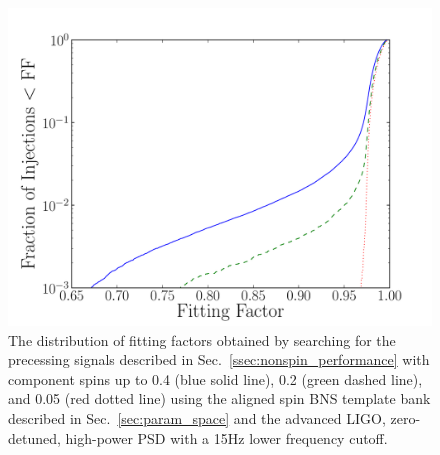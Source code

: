 \begin{figure}
\begin{center}
\includegraphics[width=1.0\textwidth]{papers/bns_spin/figure10.pdf}
\end{center}
\caption{\label{fig:anstar-prec} The distribution of fitting factors obtained by searching
for the precessing signals described in Sec.~\ref{ssec:nonspin_performance}
with component spins up to 0.4 (blue solid line), 0.2 (green dashed line), and 0.05 (red dotted line) using the aligned spin
BNS template bank described in Sec.~\ref{sec:param_space} and the advanced LIGO, zero-detuned,
high-power PSD with a 15Hz lower frequency cutoff.}
\end{figure}
